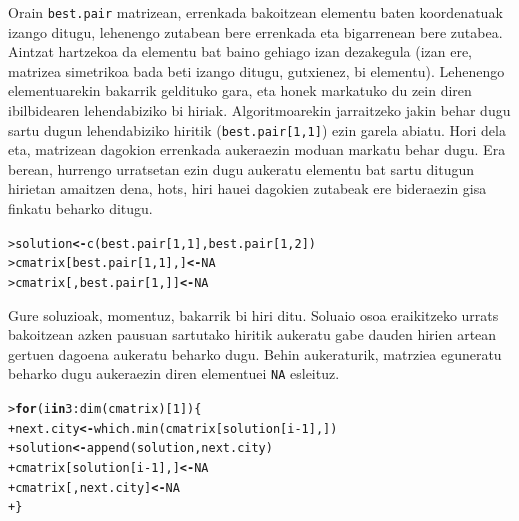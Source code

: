 \documentclass[eu]{ifirak}\usepackage[]{graphicx}\usepackage[]{color}
\makeatletter
\newcommand{\hlnum}[1]{\textcolor[rgb]{0.659,0.4,0.051}{#1}}%
\newcommand{\hlopt}[1]{\textcolor[rgb]{0,0,0}{#1}}%
\newcommand{\hlstd}[1]{\textcolor[rgb]{0,0,0}{#1}}%
\newcommand{\hlkwa}[1]{\textcolor[rgb]{0.133,0.224,0.659}{\textbf{#1}}}%
\newcommand{\hlkwb}[1]{\textcolor[rgb]{0.549,0.114,0.412}{\textbf{#1}}}%
\newcommand{\hlkwd}[1]{\textcolor[rgb]{0.659,0.133,0.482}{#1}}%
\newenvironment{kframe}{%
 \def\at@end@of@kframe{}%
 \ifinner\ifhmode%
  \def\at@end@of@kframe{\end{minipage}}%
  \begin{minipage}{\columnwidth}%
 \fi\fi%
 \def\FrameCommand##1{\hskip\@totalleftmargin \hskip-\fboxsep
 \colorbox{shadecolor}{##1}\hskip-\fboxsep
     \hskip-\linewidth \hskip-\@totalleftmargin \hskip\columnwidth}%
 \MakeFramed {\advance\hsize-\width
   \@totalleftmargin\z@ \linewidth\hsize
   \@setminipage}}%
 {\par\unskip\endMakeFramed%
 \at@end@of@kframe}
\newenvironment{knitrout}{}{} %
\newcommand{\code}[1]{\texttt{#1}}
\makeatother
\begin{document}
Orain \code{best.pair} matrizean, errenkada bakoitzean elementu baten koordenatuak izango ditugu, lehenengo zutabean bere errenkada eta bigarrenean bere zutabea. Aintzat hartzekoa da elementu bat baino gehiago izan dezakegula (izan ere, matrizea simetrikoa bada beti izango ditugu, gutxienez, bi elementu). Lehenengo elementuarekin bakarrik geldituko gara, eta honek markatuko du zein diren ibilbidearen lehendabiziko bi hiriak. Algoritmoarekin jarraitzeko jakin behar dugu sartu dugun lehendabiziko hiritik (\code{best.pair[1,1]}) ezin garela abiatu. Hori dela eta, matrizean dagokion errenkada aukeraezin moduan markatu behar dugu. Era berean, hurrengo urratsetan ezin dugu aukeratu elementu bat sartu ditugun hirietan amaitzen dena, hots, hiri hauei dagokien zutabeak ere bideraezin gisa finkatu beharko ditugu.

\begin{knitrout}
\color{fgcolor}\begin{kframe}
\begin{alltt}
\hlstd{> }\hlstd{solution} \hlkwb{<-} \hlkwd{c}\hlstd{(best.pair[}\hlnum{1}\hlstd{,}\hlnum{1}\hlstd{],best.pair[}\hlnum{1}\hlstd{,}\hlnum{2}\hlstd{])}
\hlstd{> }\hlstd{cmatrix[best.pair[}\hlnum{1}\hlstd{,}\hlnum{1}\hlstd{],]}\hlkwb{<-}\hlnum{NA}
\hlstd{> }\hlstd{cmatrix[ , best.pair[}\hlnum{1}\hlstd{,]]}\hlkwb{<-}\hlnum{NA}
\end{alltt}
\end{kframe}
\end{knitrout}

Gure soluzioak, momentuz, bakarrik bi hiri ditu. Soluaio osoa eraikitzeko urrats bakoitzean azken pausuan sartutako hiritik aukeratu gabe dauden hirien artean gertuen dagoena aukeratu beharko dugu. Behin aukeraturik, matrziea eguneratu beharko dugu aukeraezin diren elementuei \code{NA} esleituz.

\begin{knitrout}
\color{fgcolor}\begin{kframe}
\begin{alltt}
\hlstd{> }\hlkwa{for} \hlstd{(i} \hlkwa{in} \hlnum{3}\hlopt{:}\hlkwd{dim}\hlstd{(cmatrix)[}\hlnum{1}\hlstd{])\{}
\hlstd{+ }  \hlstd{next.city} \hlkwb{<-} \hlkwd{which.min} \hlstd{(cmatrix[solution[i}\hlopt{-}\hlnum{1}\hlstd{],])}
\hlstd{+ }  \hlstd{solution} \hlkwb{<-} \hlkwd{append}\hlstd{(solution , next.city)}
\hlstd{+ }  \hlstd{cmatrix[solution[i}\hlopt{-}\hlnum{1}\hlstd{],]} \hlkwb{<-} \hlnum{NA}
\hlstd{+ }  \hlstd{cmatrix[ , next.city]} \hlkwb{<-} \hlnum{NA}
\hlstd{+ }\hlstd{\}}
\end{alltt}
\end{kframe}
\end{knitrout}
\end{document}

